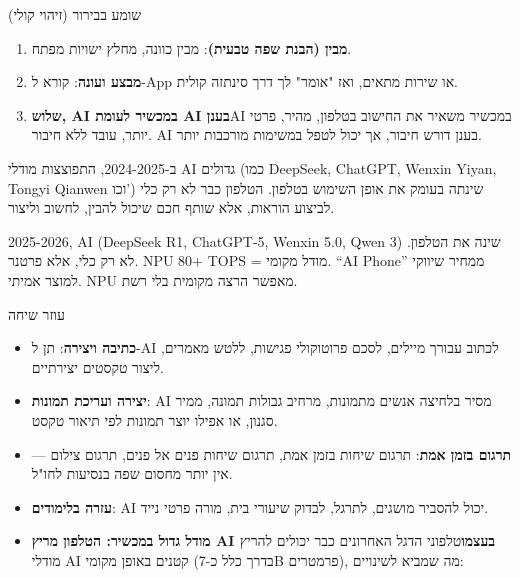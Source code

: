 


שומע בבירור (זיהוי קולי)


\begin{enumerate}
  \item \textbf{מבין (הבנת שפה טבעית)}: מבין כוונה, מחלץ ישויות מפתח.
  \item \textbf{מבצע ועונה}: קורא ל-App או שירות מתאים, ואז "אומר" לך דרך סינתזה קולית.
  \item \textbf{שלוש, AI במכשיר לעומת AI בענן}AI במכשיר משאיר את החישוב בטלפון, מהיר, פרטי יותר, עובד ללא חיבור. AI בענן דורש חיבור, אך יכול לטפל במשימות מורכבות יותר.
\end{enumerate}


ב-2024-2025, התפוצצות מודלי AI גדולים (כמו DeepSeek, ChatGPT, Wenxin Yiyan, Tongyi Qianwen וכו') שינתה בעומק את אופן השימוש בטלפון. הטלפון כבר לא רק כלי לביצוע הוראות, אלא שותף חכם שיכול להבין, לחשוב וליצור.


2025-2026, AI (DeepSeek R1, ChatGPT-5, Wenxin 5.0, Qwen 3) שינה את הטלפון. לא רק כלי, אלא פרטנר. NPU 80+ TOPS = מודל מקומי. “AI Phone” ממחיר שיווקי למוצר אמיתי. NPU מאפשר הרצה מקומית בלי רשת.


עוזר שיחה


\begin{itemize}
  \item \textbf{כתיבה ויצירה}: תן ל-AI לכתוב עבורך מיילים, לסכם פרוטוקולי פגישות, ללטש מאמרים, ליצור טקסטים יצירתיים.
  \item \textbf{יצירה ועריכת תמונות}: AI מסיר בלחיצה אנשים מתמונות, מרחיב גבולות תמונה, ממיר סגנון, או אפילו יוצר תמונות לפי תיאור טקסט.
  \item \textbf{תרגום בזמן אמת}: תרגום שיחות בזמן אמת, תרגום שיחות פנים אל פנים, תרגום צילום — אין יותר מחסום שפה בנסיעות לחו"ל.
  \item \textbf{עזרה בלימודים}: AI יכול להסביר מושגים, לתרגל, לבדוק שיעורי בית, מורה פרטי נייד.
  \item \textbf{מודל גדול במכשיר: הטלפון מריץ AI בעצמו}טלפוני הדגל האחרונים כבר יכולים להריץ מודלי AI קטנים באופן מקומי (בדרך כלל כ-7B פרמטרים), מה שמביא לשינויים:
\end{itemize}

